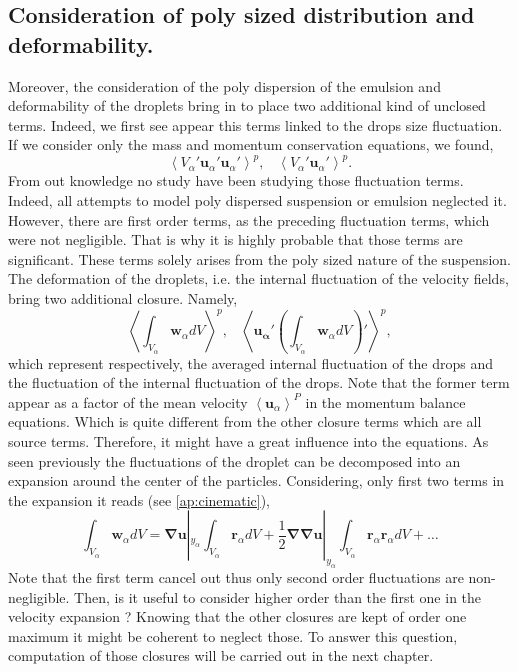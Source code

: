 \subsection{Consideration of poly sized distribution and deformability.}

Moreover, the consideration of the poly dispersion of the emulsion and deformability of the droplets bring in to place two additional kind of unclosed terms.
Indeed, we first see appear this terms linked to the drops size fluctuation.
If we consider only the mass and momentum conservation equations, we found,
\begin{equation}
    \left<V_\alpha' \bm{u}_\alpha'\bm{u}_\alpha'\right>^p,\;\;\;
    \left<V_\alpha' \bm{u}_\alpha'\right>^p.
\end{equation} 
From out knowledge no study have been studying those fluctuation terms.
Indeed, all attempts to model poly dispersed suspension or emulsion neglected it. 
However, there are first order terms, as the preceding fluctuation terms, which were not negligible.
That is why it is highly probable that those terms are significant.
These terms solely arises from the poly sized nature of the suspension.
The deformation of the droplets, i.e. the internal fluctuation of the velocity fields, bring two additional closure.
Namely,
\begin{equation}
    \left<\int_{V_\alpha} \bm{w}_\alpha dV\right>^p,\;\;\;
    \left<\bm{u_\alpha}'\left(\int_{V_\alpha} \bm{w}_\alpha dV\right)'\right>^p,
\end{equation}
which represent respectively, the averaged internal fluctuation of the drops and the fluctuation of the internal fluctuation of the drops.
Note that the former term appear as a factor of the mean velocity $\left<\bm{u}_\alpha\right>^P$ in the momentum balance equations. 
Which is quite different from the other closure terms which are all source terms.
Therefore, it might have a great influence into the equations. 
As seen previously the fluctuations of the droplet can be decomposed into an expansion around the center of the particles.  
Considering, only first two terms in the expansion it reads (see \ref{ap:cinematic}), 
\begin{equation}
    \int_{V_\alpha} \bm{w}_\alpha dV
    =  \bm{\nabla u}|_{y_\alpha} \int_{V_\alpha} \bm{r}_\alpha dV
    +  \frac{1}{2}\bm{\nabla\nabla u}|_{y_\alpha} \int_{V_\alpha} \bm{r}_\alpha\bm{r}_\alpha dV
    + \ldots
\end{equation}
Note that the first term cancel out thus only second order fluctuations are non-negligible. 
Then, is it useful to consider higher order than the first one in the velocity expansion ? 
Knowing that the other closures are kept of order one maximum it might be coherent to neglect those.
To answer this question, computation of those closures will be carried out in the next chapter. 

